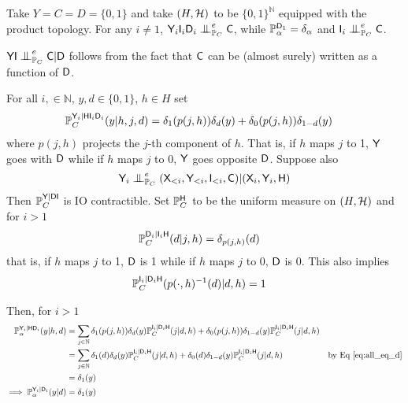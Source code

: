 \begin{example}
Take $Y=C=D=\{0,1\}$ and take $(H,\mathcal{H})$ to be $\{0,1\}^{\mathbb{N}}$ equipped with the product topology. For any $i\neq 1$, $\RV{Y}_i\RV{I}_i\RV{D}_i\CI^e_{\prob{P}_C} \RV{C}$, while $\mathbb{P}_\alpha^{\mathsf{D}_1}=\delta_\alpha$ and $\RV{I}_i\CI^e_{\prob{P}_C} \RV{C}$.

$\RV{YI}\CI^e_{\prob{P}_C} \RV{C}|\RV{D}$ follows from the fact that $\mathsf{C}$ can be (almost surely) written as a function of $\mathsf{D}$.

For all $i,\in \mathbb{N}$, $y,d\in \{0,1\}$, $h\in H$ set
\begin{align}
    \mathbb{P}_C^{\mathsf{Y}_i|\mathsf{H}\mathsf{I}_i\mathsf{D}_i}(y|h,j,d) &= \delta_1(p(j,h))\delta_d(y) + \delta_0(p(j,h))\delta_{1-d}(y)
\end{align}
where $p(j,h)$ projects the $j$-th component of $h$. That is, if $h$ maps $j$ to 1, $\mathsf{Y}$ goes with $\mathsf{D}$ while if $h$ maps $j$ to $0$, $\mathsf{Y}$ goes opposite $\mathsf{D}$. Suppose also 
\begin{align}
    \RV{Y}_i\CI_{\prob{P}_C}^e (\RV{X}_{<i},\RV{Y}_{<i},\RV{I}_{<i},\RV{C})|(\RV{X}_i,\RV{Y}_i,\RV{H})
\end{align}
Then $\mathbb{P}_C^{\mathsf{Y}|\mathsf{DI}}$ is IO contractible. Set $\mathbb{P}_{C}^{\mathsf{H}}$ to be the uniform measure on $(H,\mathcal{H})$ and for $i>1$
\begin{align}
    \mathbb{P}_C^{\mathsf{D}_i|\mathsf{I}_i\mathsf{H}}(d|j,h) &= \delta_{p(j,h)}(d)
\end{align}
that is, if $h$ maps $j$ to 1, $\mathsf{D}$ is 1 while if $h$ maps $j$ to $0$, $\mathsf{D}$ is 0. This also implies
\begin{align}
    \mathbb{P}_C^{\mathsf{I}_i|\mathsf{D}_i\mathsf{H}}(p(\cdot,h)^{-1}(d)|d,h) &= 1\label{eq:all_eq_d}
\end{align}

Then, for $i>1$
\begin{align}
    \mathbb{P}_\alpha^{\mathsf{Y}_i|\mathsf{H}\mathsf{D}_i}(y|h,d) &= \sum_{j\in \mathbb{N}} \delta_1(p(j,h))\delta_d(y)\mathbb{P}_C^{\mathsf{I}_i|\mathsf{D}_i\mathsf{H}}(j|d,h) + \delta_0(p(j,h))\delta_{1-d}(y)\mathbb{P}_C^{\mathsf{I}_i|\mathsf{D}_i\mathsf{H}}(j|d,h)\\
    &= \sum_{j\in \mathbb{N}} \delta_1(d)\delta_d(y)\mathbb{P}_C^{\mathsf{I}_i|\mathsf{D}_i\mathsf{H}}(j|d,h) + \delta_0(d)\delta_{1-d}(y)\mathbb{P}_C^{\mathsf{I}_i|\mathsf{D}_i\mathsf{H}}(j|d,h)&\text{by Eq \eqref{eq:all_eq_d}}\\
    &= \delta_1(y)\\
    \implies \mathbb{P}_\alpha^{\mathsf{Y}_i|\mathsf{D}_i}(y|d) &= \delta_1(y)
\end{align}


\end{example}
